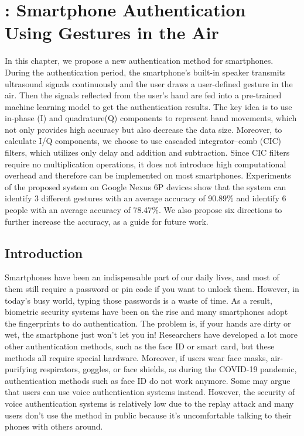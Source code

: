 \chapter{{\uu}: Smartphone Authentication \protect \\ Using Gestures in the Air}

In this chapter, we propose a new authentication method for smartphones. During the authentication period, the smartphone's built-in speaker transmits ultrasound signals continuously and the user draws a user-defined gesture in the air. Then the signals reflected from the user's hand are fed into a pre-trained machine learning model to get the authentication results. The key idea is to use in-phase (I) and quadrature(Q) components to represent hand movements, which not only provides high accuracy but also decrease the data size. Moreover, to calculate I/Q components, we choose to use cascaded integrator–comb (CIC) filters, which utilizes only delay and addition and subtraction. Since CIC filters require no multiplication operations, it does not introduce high computational overhead and therefore can be implemented on most smartphones. Experiments of the proposed {\uu} system on Google Nexus 6P devices show that the system can identify 3 different gestures with an average accuracy of 90.89\% and identify 6 people with an average accuracy of 78.47\%. We also propose six directions to further increase the accuracy, as a guide for future work.


\section{Introduction}
Smartphones have been an indispensable part of our daily lives, and most of them still require a password or pin code if you want to unlock them. However, in today’s busy world, typing those passwords is a waste of time. As a result, biometric security systems have been on the rise and many smartphones adopt the fingerprints to do authentication. The problem is, if your hands are dirty or wet, the smartphone just won’t let you in! Researchers have developed a lot more other authentication methods, such as the face ID or smart card, but these methods all require special hardware. Moreover, if users wear face masks, air-purifying respirators, goggles, or face shields, as during the COVID-19 pandemic, authentication methods such as face ID do not work anymore. Some may argue that users can use voice authentication systems instead. However, the security of voice authentication systems is relatively low due to the replay attack and many users don't use the method in public because it’s uncomfortable talking to their phones with others around.

